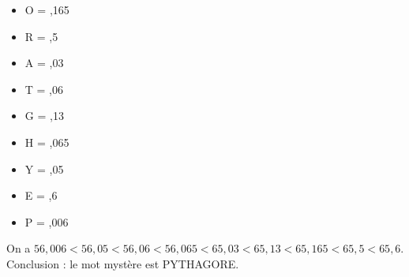    \begin{itemize}
      \item O = ,165
      \item R = ,5
      \item A = ,03
      \item T = ,06
      \item G = ,13
      \item H = ,065
      \item Y = ,05
      \item E = ,6
      \item P = ,006
   \end{itemize}
   On a {\blue $56,006 < 56,05 < 56,06 < 56,065 < 65,03 < 65,13 < 65,165 < 65,5 < 65,6$}. \\
   Conclusion : le mot mystère est \blue PYTHAGORE. \\
